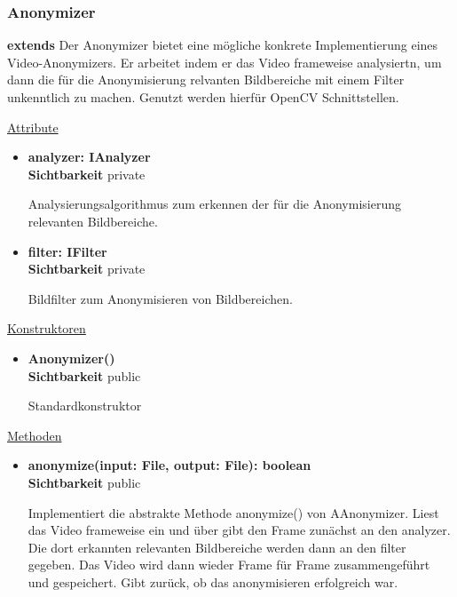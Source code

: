 \subsubsection{Anonymizer} \label{service:klasse:Anonymizer}
\textbf{extends}  \newline
Der Anonymizer bietet eine mögliche konkrete Implementierung eines Video-Anonymizers. Er arbeitet indem er das Video frameweise analysiertn, um dann die für die Anonymisierung relvanten Bildbereiche mit einem Filter unkenntlich zu machen. Genutzt werden hierfür OpenCV Schnittstellen.\newline

\underline{Attribute}
\begin{itemize}
\itemsep0pt
\item \textbf{analyzer: IAnalyzer} \hfill\\ 
\textbf{Sichtbarkeit} private

Analysierungsalgorithmus zum erkennen der für die Anonymisierung relevanten Bildbereiche.

\item \textbf{filter: IFilter} \hfill\\ 
\textbf{Sichtbarkeit} private

Bildfilter zum Anonymisieren von Bildbereichen.
\end{itemize}

\underline{Konstruktoren}
\begin{itemize}
\itemsep0pt
\item \textbf{Anonymizer()} \hfill\\
\textbf{Sichtbarkeit} public

Standardkonstruktor
\end{itemize}

\underline{Methoden}
\begin{itemize}
\itemsep0pt
\item \textbf{anonymize(input: File, 
output: File): boolean}\hfill\\
\textbf{Sichtbarkeit} public

Implementiert die abstrakte Methode anonymize() von AAnonymizer. Liest das Video frameweise ein und über gibt den Frame zunächst an den analyzer. Die dort erkannten relevanten Bildbereiche werden dann an den filter gegeben. Das Video wird dann wieder Frame für Frame zusammengeführt und gespeichert. Gibt zurück, ob das anonymisieren erfolgreich war.

\end{itemize}